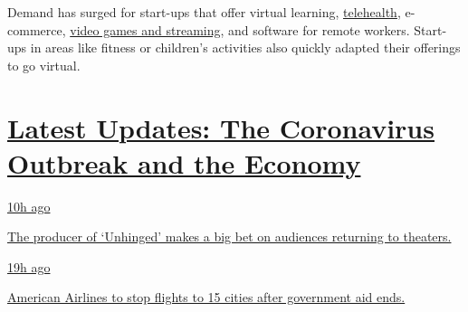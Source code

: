 Demand has surged for start-ups that offer virtual learning,
\href{https://www.nytimes3xbfgragh.onion/2020/08/03/health/covid-telemedicine-congress.html}{telehealth},
e-commerce,
\href{https://www.nytimes3xbfgragh.onion/interactive/2020/04/07/technology/coronavirus-internet-use.html}{video
games and streaming}, and software for remote workers. Start-ups in
areas like fitness or children's activities also quickly adapted their
offerings to go virtual.

\hypertarget{latest-updates-the-coronavirus-outbreak-and-the-economy}{%
\section{\texorpdfstring{\href{https://www.nytimes3xbfgragh.onion/live/2020/08/20/business/stock-market-today-coronavirus?action=click\&pgtype=Article\&state=default\&region=MAIN_CONTENT_1\&context=storylines_live_updates}{Latest
Updates: The Coronavirus Outbreak and the
Economy}}{Latest Updates: The Coronavirus Outbreak and the Economy}}\label{latest-updates-the-coronavirus-outbreak-and-the-economy}}

\href{https://www.nytimes3xbfgragh.onion/live/2020/08/20/business/stock-market-today-coronavirus?action=click\&pgtype=Article\&state=default\&region=MAIN_CONTENT_1\&context=storylines_live_updates\#the-producer-of-unhinged-makes-a-big-bet-on-audiences-returning-to-theaters}{10h
ago}

\href{https://www.nytimes3xbfgragh.onion/live/2020/08/20/business/stock-market-today-coronavirus?action=click\&pgtype=Article\&state=default\&region=MAIN_CONTENT_1\&context=storylines_live_updates\#the-producer-of-unhinged-makes-a-big-bet-on-audiences-returning-to-theaters}{The
producer of `Unhinged' makes a big bet on audiences returning to
theaters.}

\href{https://www.nytimes3xbfgragh.onion/live/2020/08/20/business/stock-market-today-coronavirus?action=click\&pgtype=Article\&state=default\&region=MAIN_CONTENT_1\&context=storylines_live_updates\#american-airlines-to-stop-flights-to-15-cities-after-government-aid-ends}{19h
ago}

\href{https://www.nytimes3xbfgragh.onion/live/2020/08/20/business/stock-market-today-coronavirus?action=click\&pgtype=Article\&state=default\&region=MAIN_CONTENT_1\&context=storylines_live_updates\#american-airlines-to-stop-flights-to-15-cities-after-government-aid-ends}{American
Airlines to stop flights to 15 cities after government aid ends.}

